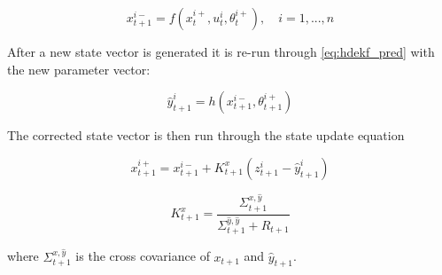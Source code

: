 \begin{equation}\label{eq:hdekf_predict_2}
x_{t+1}^{i-} = f(x_{t}^{i+}, u_{t}^{i}, \theta^{i+}_{t}), \quad i=1,...,n
\end{equation}

After a new state vector is generated it is re-run through \eqref{eq:hdekf_pred} with the new parameter vector:

\begin{equation}\label{eq:hdekf_pred_2}
\hat{y}_{t+1}^{i} = h(x_{t+1}^{i-}, \theta_{t+1}^{i+})
\end{equation}

The corrected state vector is then run through the state update equation

\begin{equation}\label{eq:hdekf_state_update}
x_{t+1}^{i+} = x_{t+1}^{i-} + K_{t+1}^{x}(z_{t+1}^{i}-\hat{y}_{t+1}^{i})
\end{equation}
 
\begin{equation}\label{eq:hdekf_param_k}
K_{t+1}^{x} = \frac{\Sigma^{x,\hat{y}}_{t+1}}{\Sigma^{\hat{y},\hat{y}}_{t+1} + R_{t+1}}
\end{equation}

where $\Sigma^{x,\hat{y}}_{t+1}$ is the cross covariance of $x_{t+1}$ and $\hat{y}_{t+1}$.



